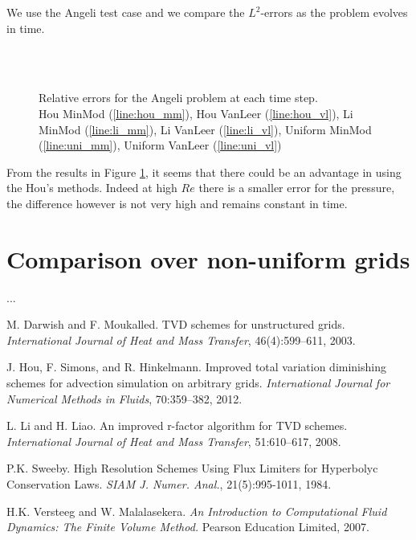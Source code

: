 \documentclass[11pt, a4paper]{article}
\begin{document}
We use the Angeli test case and we compare the $L^2$-errors as the problem 
evolves in time.
\begin{figure}[h]
	\centering
	\subfloat[][Pressure relative error, $Re = 1$]{
		}
	\subfloat[][Pressure relative error, $Re = 1000$]{
		}\\
	\subfloat[][$v_x$ relative error, $Re = 1$]{
		}
	\subfloat[][$v_x$ relative error, $Re = 1000$]{
		}\\
	\subfloat[][$v_y$ relative error, $Re = 1$]{
		}
	\subfloat[][$v_y$ relative error, $Re = 1000$]{
		}
	\caption{Relative errors for the Angeli problem at each time step.\\
			 Hou MinMod (\ref{line:hou_mm}), Hou VanLeer (\ref{line:hou_vl}),
			 Li MinMod (\ref{line:li_mm}), Li VanLeer (\ref{line:li_vl}),
			 Uniform MinMod (\ref{line:uni_mm}), Uniform VanLeer 
			 (\ref{line:uni_vl})}
	\label{fig:ang}
\end{figure}
From the results in Figure \ref{fig:ang}, it seems that there could be an 
advantage in using the Hou's methods. Indeed at high $Re$ there is a smaller 
error for the pressure, the difference however is not very high and remains 
constant in time.

\section{Comparison over non-uniform grids}
...
\begin{thebibliography}{99}\label{sec:bib}
		
	 M. Darwish and F. Moukalled. TVD schemes for unstructured 
	grids. \emph{International Journal of Heat and Mass Transfer}, 
	46(4):599–611, 2003.
	
	 J. Hou, F. Simons, and R. Hinkelmann. Improved total 
	variation diminishing schemes for advection simulation on arbitrary grids. 
	\emph{International Journal for Numerical Methods in Fluids}, 70:359–382, 
	2012.
	
	 L. Li and H. Liao. An improved r-factor algorithm for TVD 
	schemes. \emph{International Journal of Heat and Mass Transfer}, 
	51:610–617, 2008.
	
	 P.K. Sweeby. High Resolution Schemes Using Flux Limiters 
	for Hyperbolyc Conservation Laws. \emph{SIAM J. Numer. Anal.}, 
	21(5):995-1011, 1984.
	
	 H.K. Versteeg and W. Malalasekera. \emph{An Introduction 
	to Computational Fluid Dynamics: The Finite Volume Method.} Pearson 
	Education Limited, 2007.
	
\end{thebibliography}
\end{document}
